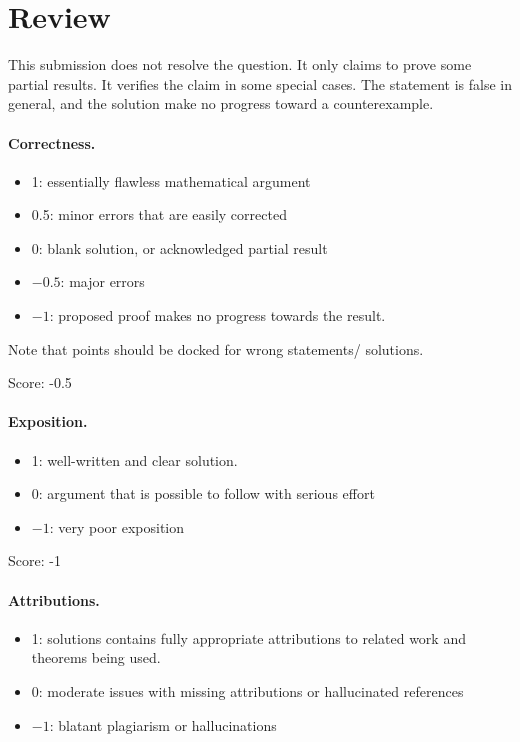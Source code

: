 \documentclass[11pt]{article}
\theoremstyle{definition}
\theoremstyle{remark}
\begin{document}
\maketitle

\section{Review}
{This submission does not resolve the question. It only claims to prove some partial results. It verifies the claim in some special cases. The statement is false in general, and the solution make no progress toward a counterexample.
}

\paragraph{Correctness.}
\begin{itemize}
	\item  1: essentially flawless mathematical argument
	\item  0.5: minor errors that are easily corrected
	\item  0: blank solution, or acknowledged partial result
	\item  $-0.5$: major errors
	\item  $-1$: proposed proof makes no progress towards the result.
\end{itemize}
Note that points should be docked for wrong statements/ solutions.

\noindent Score: -0.5

\paragraph{Exposition.}
\begin{itemize}
	\item  1: well-written and clear solution.
	\item  0: argument that is possible to follow with serious effort
	\item  $-1$: very poor exposition
\end{itemize}

\noindent Score: -1

\paragraph{Attributions.}
\begin{itemize}
	\item  1: solutions contains fully appropriate attributions
		to related work and theorems being used.
	\item  0: moderate issues with missing attributions or hallucinated references
	\item  $-1$: blatant plagiarism or hallucinations
\end{itemize}
\end{document}

